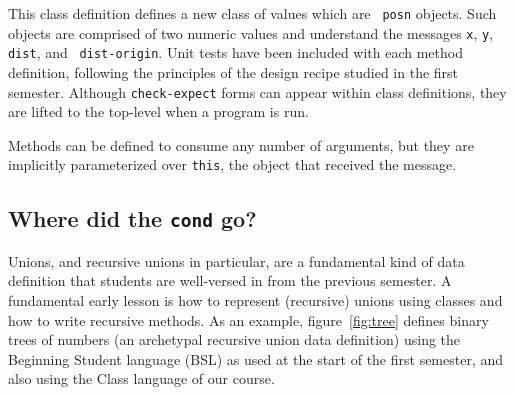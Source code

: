 \documentclass[submission,copyright]{eptcs}
\begin{document}
This class definition defines a new class of values which are {\tt
  posn} objects.  Such objects are comprised of two numeric values and
understand the messages {\tt x}, {\tt y}, {\tt dist}, and {\tt
  dist-origin}.  Unit tests have been included with each method
definition, following the principles of the design recipe studied in
the first semester.  Although {\tt check-expect} forms can appear
within class definitions, they are lifted to the top-level when a
program is run.

Methods can be defined to consume any number of arguments, but they
are implicitly parameterized over {\tt this}, the object that received
the message.

\subsection{Where did the {\tt cond} go?}

Unions, and recursive unions in particular, are a fundamental kind of
data definition that students are well-versed in from the previous
semester.  A fundamental early lesson is how to represent (recursive)
unions using classes and how to write recursive methods.  As an
example, figure~\ref{fig:tree} defines binary trees of numbers
(an archetypal recursive union data definition)
using the Beginning Student language (BSL) as used at the start of the
first semester, and also using the Class language of our course.


\end{document}
